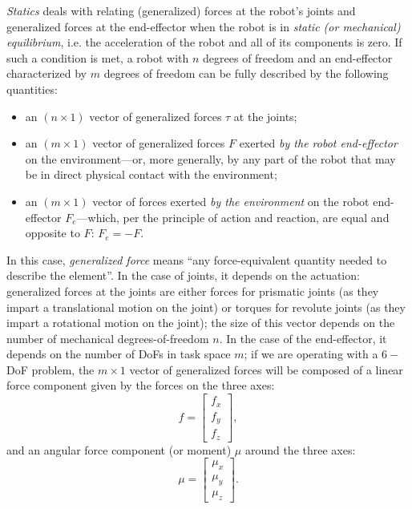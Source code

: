 \textsl{Statics} deals with relating (generalized) forces at the robot's joints and generalized forces at the end-effector when the robot is in \textsl{static (or mechanical) equilibrium}, i.e. the acceleration of the robot and all of its components is zero.
If such a condition is met, a robot with $n$ degrees of freedom and an end-effector characterized by $m$ degrees of freedom can be fully described by the following quantities:
\begin{itemize}
    \item an $\left( n \times 1 \right)$ vector of generalized forces $\tau$ at the joints;
    \item an $\left( m \times 1 \right)$ vector of generalized forces $F$ exerted \textsl{by the robot end-effector} on the environment---or, more generally, by any part of the robot that may be in direct physical contact with the environment;
    \item an $\left( m \times 1 \right)$ vector of forces exerted \textsl{by the environment} on the robot end-effector $F_e$---which, per the principle of action and reaction, are equal and opposite to $F$: $F_e=-F$.
\end{itemize}
In this case, \textsl{generalized force} means ``any force-equivalent quantity needed to describe the element''.
In the case of joints, it depends on the actuation: generalized forces at the joints are either forces for prismatic joints (as they impart a translational motion on the joint) or torques for revolute joints (as they impart a rotational motion on the joint); the size of this vector depends on the number of mechanical degrees-of-freedom $n$.
In the case of the end-effector, it depends on the number of DoFs in task space $m$; if we are operating with a $6-$DoF problem, the $m \times 1$ vector of generalized forces will be composed of a linear force component given by the forces on the three axes:
\begin{equation}\label{eq:wrench:force}
f=\left[\begin{array}{c}
f_x\\
f_y\\
f_z
\end{array}
\right],
\end{equation}
and an angular force component (or moment) $\mu$ around the three axes:
\begin{equation}\label{eq:wrench:moment}
\mu=\left[\begin{array}{c}
\mu_x\\
\mu_y\\
\mu_z
\end{array}
\right].
\end{equation}
